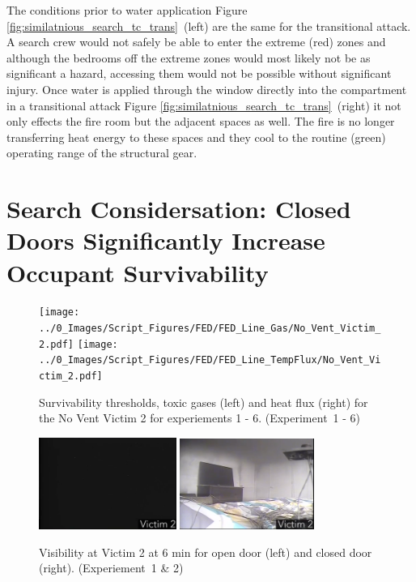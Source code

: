 \documentclass[12pt,oneside]{book}
\begin{document}
The conditions prior to water application Figure \ref{fig:similatnious_search_tc_trans}~(left) are the same for the transitional attack. A search crew would not safely be able to enter the extreme (red) zones and although the bedrooms off the extreme zones would most likely not be as significant a hazard, accessing them would not be possible without significant injury. Once water is applied through the window directly into the compartment in a transitional attack Figure \ref{fig:similatnious_search_tc_trans}~(right) it not only effects the fire room but the adjacent spaces as well. The fire is no longer transferring heat energy to these spaces and they cool to the routine (green) operating range of the structural gear. 

\section{Search Considersation: Closed Doors Significantly Increase Occupant Survivability} \label{tc:Search_Considersation_Closed_Doors}

\begin{figure}[H]
\centering
\texttt{[image: ../0\_Images/Script\_Figures/FED/FED\_Line\_Gas/No\_Vent\_Victim\_2.pdf]}
\texttt{[image: ../0\_Images/Script\_Figures/FED/FED\_Line\_TempFlux/No\_Vent\_Victim\_2.pdf]}
\caption[Survivability Thresholds - Toxic Gases - Heat Flux]{Survivability thresholds, toxic gases (left) and heat flux (right) for the No Vent Victim 2 for experiements 1 - 6. (Experiment~1 - 6)}
\label{fig:search_consideration_survivability}
\end{figure}

\begin{figure}[H]
\centering
\includegraphics[width=0.4\textwidth]{../0_Images/Tactical_Considerations/Closed_Door/Experiment_1_Vic_2_600sec.png}
\includegraphics[width=0.39\textwidth]{../0_Images/Tactical_Considerations/Closed_Door/Experiment_2_Vic_2_600sec.png} 
\caption[Visibility]{Visibility at Victim 2 at 6 min for open door (left) and closed door (right). (Experiement~1 \& 2)}
\label{fig:search_consideration_visibility}
\end{figure}
\end{document}
